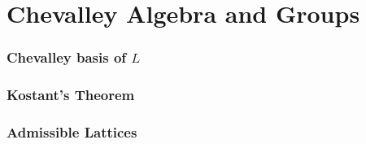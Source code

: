 \part{Chevalley Algebra and Groups}
\section{Chevalley basis of $L$}

\section{Kostant's Theorem}

\section{Admissible Lattices}